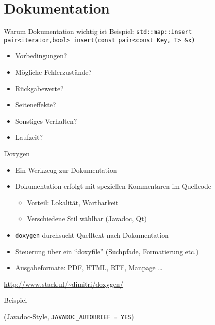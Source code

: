 \section{Dokumentation}

\begin{frame}{Warum Dokumentation wichtig ist}
	Beispiel: \texttt{std::map::insert} \\
	\texttt{pair<iterator,bool> insert(const pair<const Key, T> \&x)}
	
	\begin{itemize}
		\item Vorbedingungen?
		\item Mögliche Fehlerzustände?
		\item Rückgabewerte?
		\item Seiteneffekte?
		\item Sonstiges Verhalten?
		\item Laufzeit?
	\end{itemize}
\end{frame}

\begin{frame}{Doxygen}
	\begin{itemize}
		\item Ein Werkzeug zur Dokumentation
		\item Dokumentation erfolgt mit speziellen Kommentaren im Quellcode
		\begin{itemize}
			\item Vorteil: Lokalität, Wartbarkeit
			\item Verschiedene Stil wählbar (Javadoc, Qt)
		\end{itemize}
		\item \texttt{doxygen} durchsucht Quelltext nach Dokumentation
		\item Steuerung über ein \enquote{doxyfile} (Suchpfade, Formatierung etc.)
		\item Ausgabeformate: PDF, HTML, RTF, Manpage \dots
	\end{itemize}

	\footnotesize{\url{http://www.stack.nl/~dimitri/doxygen/}}
\end{frame}

\begin{frame}{Beispiel}
	
	
	(Javadoc-Style, \texttt{JAVADOC\_AUTOBRIEF = YES})
\end{frame}

